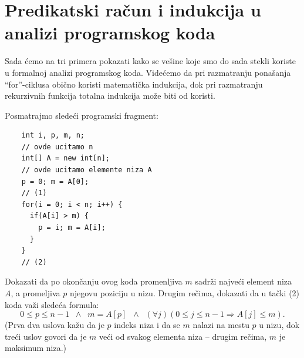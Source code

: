 \section{Predikatski ra\v cun i indukcija u analizi programskog koda}

Sada \'cemo na tri primera pokazati kako se ve\v sine koje smo do sada stekli koriste u formalnoj analizi programskog koda.
Vide\'cemo da pri razmatranju pona\v sanja ``for''-ciklusa obi\v cno koristi matemati\v cka indukcija, dok pri
razmatranju rekurzivnih funkcija totalna indukcija mo\v ze biti od koristi.

\begin{EX}\label{ft05.ex.max-niza}
  Posmatrajmo slede\'ci programski fragment:
{\small
\begin{verbatim}
    int i, p, m, n;
    // ovde ucitamo n
    int[] A = new int[n];
    // ovde ucitamo elemente niza A
    p = 0; m = A[0];
    // (1)
    for(i = 0; i < n; i++) {
      if(A[i] > m) {
        p = i; m = A[i];
      }
    }
    // (2)
\end{verbatim}
}
\noindent
  Dokazati da po okon\v canju ovog koda promenljiva $m$ sadr\v zi najve\'ci element niza $A$, a promeljiva $p$ njegovu
  poziciju u nizu. Drugim re\v cima, dokazati da u ta\v cki (2) koda va\v zi slede\'ca formula:
  $$
    0 \le p \le n - 1 \;\;\land\;\; m = A[p] \;\;\land\;\; (\forall j)(0 \le j \le n - 1 \Rightarrow A[j] \le m).
  $$
  (Prva dva uslova ka\v zu da je $p$ indeks niza i da se $m$ nalazi na mestu $p$ u nizu, dok tre\'ci uslov govori da je
  $m$ ve\'ci od svakog elementa niza -- drugim re\v cima, $m$ je maksimum niza.)
\end{EX}
